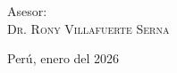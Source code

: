 \begin{titlepage}
\begin{flushleft}
		\hspace{4.0cm} Asesor:\\
		\hspace{4.5cm} \textsc{\large Dr. Rony Villafuerte Serna}
	\end{flushleft}
	
	
	\vfill
	\begin{center}
		Perú, enero del 2026\\[0.3cm]

	\end{center}
	
\end{titlepage}		
